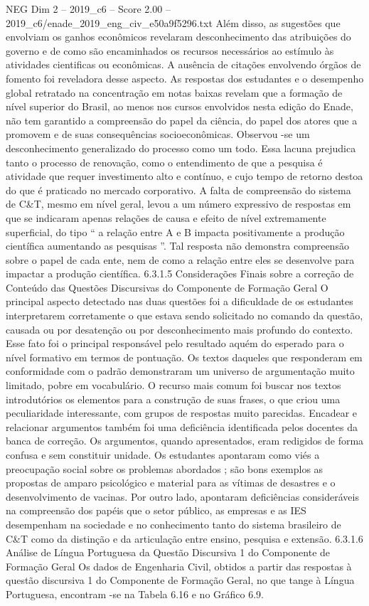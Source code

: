 \begin{textsample}{NEG Dim 2 – 2019\_c6 – Score 2.00 – 2019\_c6/enade\_2019\_eng\_civ\_e50a9f5296.txt}
Além disso, as sugestões que envolviam os ganhos econômicos revelaram desconhecimento das atribuições do governo e de como são encaminhados os recursos necessários ao estímulo às atividades cientificas ou econômicas.
A ausência de citações envolvendo órgãos de fomento foi reveladora desse aspecto.
As respostas dos estudantes e o desempenho global retratado na concentração em notas baixas revelam que a formação de nível superior do Brasil, ao menos nos cursos envolvidos nesta edição do Enade, não tem garantido a compreensão do papel da ciência, do papel dos atores que a promovem e de suas consequências socioeconômicas.
Observou -se um desconhecimento generalizado do processo como um todo.
Essa lacuna prejudica tanto o processo de renovação, como o entendimento de que a pesquisa é atividade que requer investimento alto e contínuo, e cujo tempo de retorno destoa do que é praticado no mercado corporativo.
A falta de compreensão do sistema de C\&T, mesmo em nível geral, levou a um número expressivo de respostas em que se indicaram apenas relações de causa e efeito de nível extremamente superficial, do tipo “ a relação entre A e B impacta positivamente a produção científica aumentando as pesquisas ”.
Tal resposta não demonstra compreensão sobre o papel de cada ente, nem de como a relação entre eles se desenvolve para impactar a produção científica. 6.3.1.5 Considerações Finais sobre a correção de Conteúdo das Questões Discursivas do Componente de Formação Geral O principal aspecto detectado nas duas questões foi a dificuldade de os estudantes interpretarem corretamente o que estava sendo solicitado no comando da questão, causada ou por desatenção ou por desconhecimento mais profundo do contexto.
Esse fato foi o principal responsável pelo resultado aquém do esperado para o nível formativo em termos de pontuação.
Os textos daqueles que responderam em conformidade com o padrão demonstraram um universo de argumentação muito limitado, pobre em vocabulário.
O recurso mais comum foi buscar nos textos introdutórios os elementos para a construção de suas frases, o que criou uma peculiaridade interessante, com grupos de respostas muito parecidas.
Encadear e relacionar argumentos também foi uma deficiência identificada pelos docentes da banca de correção.
Os argumentos, quando apresentados, eram redigidos de forma confusa e sem constituir unidade.
Os estudantes apontaram como viés a preocupação social sobre os problemas abordados ; são bons exemplos as propostas de amparo psicológico e material para as vítimas de desastres e o desenvolvimento de vacinas.
Por outro lado, apontaram deficiências consideráveis na compreensão dos papéis que o setor público, as empresas e as IES desempenham na sociedade e no conhecimento tanto do sistema brasileiro de C\&T como da distinção e da articulação entre ensino, pesquisa e extensão. 6.3.1.6 Análise de Língua Portuguesa da Questão Discursiva 1 do Componente de Formação Geral Os dados de Engenharia Civil, obtidos a partir das respostas à questão discursiva 1 do Componente de Formação Geral, no que tange à Língua Portuguesa, encontram -se na Tabela 6.16 e no Gráfico 6.9.

\end{textsample}
